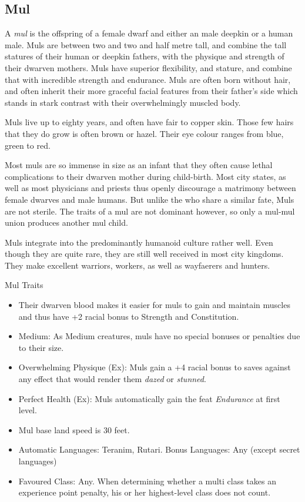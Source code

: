 \subsection{Mul}
\label{sec:Mul}

A \emph{mul} is the offspring of a female dwarf and either an male deepkin or
a human male. Muls are between two and two and half metre tall, and combine
the tall statures of their human or deepkin fathers, with the physique and
strength of their dwarven mothers. Muls have superior flexibility, and
stature, and combine that with incredible strength and endurance. Muls are
often born without hair, and often inherit their more graceful facial features
from their father's side which stands in stark contrast with their
overwhelmingly muscled body.

Muls live up to eighty years, and often have fair to copper skin. Those few
hairs that they do grow is often brown or hazel. Their eye colour ranges from
blue, green to red.

Most muls are so immense in size as an infant that they often cause lethal
complications to their dwarven mother during child-birth. Most city states, as
well as most physicians and priests thus openly discourage a matrimony between
female dwarves and male humans. But unlike the  who
share a similar fate, Muls are not sterile. The traits of a mul are not
dominant however, so only a mul-mul union produces another mul child.

Muls integrate into the predominantly humanoid culture rather well. Even though
they are quite rare, they are still well received in most city kingdoms. They
make excellent warriors, workers, as well as wayfaerers and hunters.

\begin{35e}{Mul Traits}
  \begin{itemize}[noitemsep]
  \item Their dwarven blood makes it easier for muls to gain and maintain
    muscles and thus have +2 racial bonus to Strength and Constitution.
  \item Medium: As Medium creatures, muls have no special bonuses or penalties
    due to their size.
  \item Overwhelming Physique (Ex): Muls gain a +4 racial bonus to saves against
    any effect that would render them \emph{dazed} or \emph{stunned}.
  \item Perfect Health (Ex): Muls automatically gain the feat \emph{Endurance}
    at first level.
  \item Mul base land speed is 30 feet.
  \item Automatic Languages: Teranim, Rutari. Bonus Languages: Any (except
    secret languages)
  \item Favoured Class: Any. When determining whether a multi class takes an
    experience point penalty, his or her highest-level class does not count.
  \end{itemize}
\end{35e}
